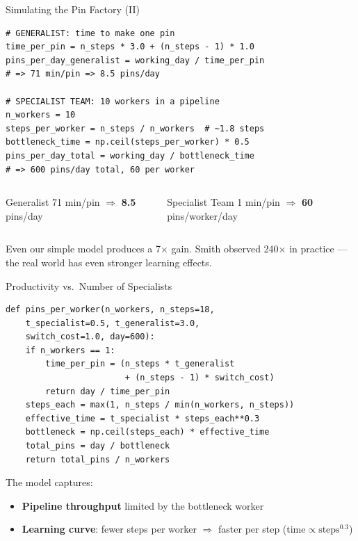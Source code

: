 \documentclass[aspectratio=169, 10pt]{beamer}
\begin{document}
\begin{frame}[fragile]{Simulating the Pin Factory (II)}
\begin{lstlisting}
# GENERALIST: time to make one pin
time_per_pin = n_steps * 3.0 + (n_steps - 1) * 1.0
pins_per_day_generalist = working_day / time_per_pin
# => 71 min/pin => 8.5 pins/day

# SPECIALIST TEAM: 10 workers in a pipeline
n_workers = 10
steps_per_worker = n_steps / n_workers  # ~1.8 steps
bottleneck_time = np.ceil(steps_per_worker) * 0.5
pins_per_day_total = working_day / bottleneck_time
# => 600 pins/day total, 60 per worker
\end{lstlisting}
\vspace{0.3em}
\begin{columns}[T]
\begin{block}{Generalist}
71 min/pin $\Rightarrow$ \textbf{8.5} pins/day
\end{block}
\begin{block}{Specialist Team}
1 min/pin $\Rightarrow$ \textbf{60} pins/worker/day
\end{block}
\end{columns}
\vspace{0.3em}
Even our simple model produces a \alert{7$\times$ gain}.
Smith observed 240$\times$ in practice --- the real world has
even stronger learning effects.
\end{frame}

\begin{frame}[fragile]{Productivity vs.\ Number of Specialists}
\begin{lstlisting}
def pins_per_worker(n_workers, n_steps=18,
    t_specialist=0.5, t_generalist=3.0,
    switch_cost=1.0, day=600):
    if n_workers == 1:
        time_per_pin = (n_steps * t_generalist
                        + (n_steps - 1) * switch_cost)
        return day / time_per_pin
    steps_each = max(1, n_steps / min(n_workers, n_steps))
    effective_time = t_specialist * steps_each**0.3
    bottleneck = np.ceil(steps_each) * effective_time
    total_pins = day / bottleneck
    return total_pins / n_workers
\end{lstlisting}
\vspace{0.3em}
The model captures:
\begin{itemize}
  \item \textbf{Pipeline throughput} limited by the bottleneck worker
  \item \textbf{Learning curve}: fewer steps per worker $\Rightarrow$
        faster per step ($\text{time} \propto \text{steps}^{0.3}$)
\end{itemize}
\end{frame}
\end{document}
